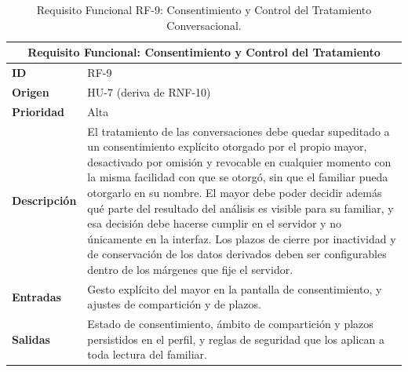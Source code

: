 \begin{table}[htbp]
    \centering
    \renewcommand{\arraystretch}{1.3}
    \begin{tabular}{|l|>{\raggedright\arraybackslash}p{}|}
        \hline
        \multicolumn{2}{|c|}{\textbf{Requisito Funcional: Consentimiento y Control del Tratamiento}} \\
        \hline
        \textbf{ID} & RF-9 \\
        \hline
        \textbf{Origen} & HU-7 (deriva de RNF-10) \\
        \hline
        \textbf{Prioridad} & Alta \\
        \hline
        \textbf{Descripción} & El tratamiento de las conversaciones debe quedar supeditado a un
            consentimiento explícito otorgado por el propio mayor, desactivado por omisión y revocable en
            cualquier momento con la misma facilidad con que se otorgó, sin que el familiar pueda otorgarlo
            en su nombre. El mayor debe poder decidir
            además qué parte del resultado del análisis es visible para su familiar, y esa decisión debe
            hacerse cumplir en el servidor y no únicamente en la interfaz. Los plazos de cierre por
            inactividad y de conservación de los datos derivados deben ser configurables dentro de los
            márgenes que fije el servidor. \\
        \hline
        \textbf{Entradas} & Gesto explícito del mayor en la pantalla de consentimiento, y ajustes de
            compartición y de plazos. \\
        \hline
        \textbf{Salidas} & Estado de consentimiento, ámbito de compartición y plazos persistidos en el
            perfil, y reglas de seguridad que los aplican a toda lectura del familiar. \\
        \hline
    \end{tabular}
    \caption{Requisito Funcional RF-9: Consentimiento y Control del Tratamiento Conversacional.}
    \label{tab:rf9}
\end{table}

